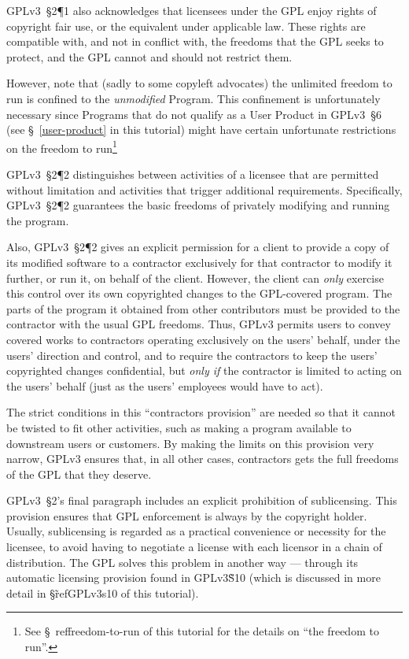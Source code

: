 GPLv3~\S2\P1 also acknowledges that licensees under the GPL enjoy rights of
copyright fair use, or the equivalent under applicable law.  These rights are
compatible with, and not in conflict with, the freedoms that the GPL seeks to
protect, and the GPL cannot and should not restrict them.

However, note that (sadly to some copyleft advocates) the unlimited freedom
to run is confined to the \textit{unmodified} Program.  This confinement is
unfortunately necessary since Programs that do not qualify as a User Product
in GPLv3~\S6 (see \S~\ref{user-product} in this tutorial) might have certain
unfortunate restrictions on the freedom to run\footnote{See
  \S~ref{freedom-to-run} of this tutorial for the details on ``the freedom to
  run''.}

GPLv3~\S2\P2 distinguishes between activities of a licensee that are
permitted without limitation and activities that trigger additional
requirements.  Specifically, GPLv3~\S2\P2 guarantees the basic freedoms of
privately modifying and running the program.

Also, GPLv3~\S2\P2 gives an explicit permission for a client to provide a
copy of its modified software to a contractor exclusively for that contractor
to modify it further, or run it, on behalf of the client.  However, the
client can \textit{only} exercise this control over its own copyrighted
changes to the GPL-covered program.  The parts of the program it obtained
from other contributors must be provided to the contractor with the usual GPL
freedoms.  Thus, GPLv3 permits users to convey covered works to contractors
operating exclusively on the users' behalf, under the users' direction and
control, and to require the contractors to keep the users' copyrighted
changes confidential, but \textit{only if} the contractor is limited to acting
on the users' behalf (just as the users' employees would have to act).

The strict conditions in this ``contractors provision'' are needed so that it
cannot be twisted to fit other activities, such as making a program available
to downstream users or customers.  By making the limits on this provision
very narrow, GPLv3 ensures that, in all other cases, contractors gets the
full freedoms of the GPL that they deserve.

GPLv3~\S2's final paragraph includes an explicit prohibition of sublicensing.
This provision ensures that GPL enforcement is always by the copyright
holder.  Usually, sublicensing is regarded as a practical convenience or
necessity for the licensee, to avoid having to negotiate a license with each
licensor in a chain of distribution.  The GPL solves this problem in another
way --- through its automatic licensing provision found in GPLv3\~S10 (which
is discussed in more detail in \S\~ref{GPLv3s10} of this tutorial).


